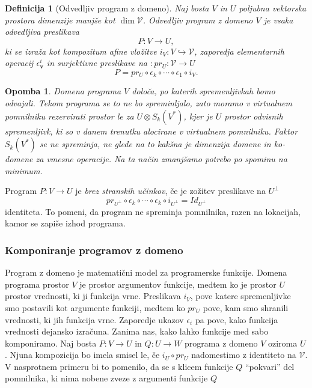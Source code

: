 \documentclass{article}
\newcommand{\VV}{\mathcal{V}}
\newcommand{\vv}{\mathbf{v}}
\newtheorem{definicija}{Definicija}[section]
\newtheorem{opomba}{Opomba}[section]
\begin{document}
\begin{definicija}[Odvedljiv program z domeno]
  Naj bosta $V$ in $U$ poljubna vektorska prostora dimenzije manjše kot $\dim \VV$.
  \emph{Odvedljiv program z domeno $V$} je vsaka odvedljiva preslikava
  \begin{equation}
    \label{eq:odvedljiv_program}
    P:V\to U,
  \end{equation}
 ki se izraža kot kompozitum  afine vložitve $i_V:V\hookrightarrow \VV$,
zaporedja elementarnih operacij $\epsilon_\vv^{i}$ in surjektivne preslikave na
$:pr_U:\VV\to U$
 \begin{equation}
   \label{eq:zapis}
   P = pr_U\circ\epsilon_{k}\circ \cdots \circ \epsilon_1\circ i_V.
 \end{equation} 
\end{definicija}
\begin{opomba}
  Domena programa $V$ določa, po katerih spremenljivkah bomo odvajali. Tekom
  programa se to ne bo spreminljalo, zato moramo v virtualnem pomnilniku
  rezervirati prostor le za $U\otimes S_k(V^*)$, kjer je $U$ prostor odvisnih
  spremenljivk, ki so v danem trenutku alocirane v virtualnem pomnilniku. Faktor 
$S_k(V^*)$ se ne spreminja, ne glede na to kakšna je dimenzija domene in
ko-domene za vmesne operacije. Na ta način zmanjšamo potrebo po spominu na minimum.
\end{opomba}

Program $P:V\to U$ je \emph{brez stranskih učinkov}, če je zožitev preslikave 
na $U^\perp$ 
$$ pr_{U^\perp}\circ \epsilon_k\circ \cdots \circ \epsilon_k\circ i_{U^\perp}=Id_{U^\perp}$$  
identiteta. To pomeni, da program ne spreminja pomnilnika, razen na lokacijah, 
kamor se zapiše izhod programa. 
 
\subsubsection{Komponiranje programov z domeno} 
 
Program z domeno je matematični model za programerske funkcije. Domena programa 
prostor $V$ je prostor argumentov funkcije, medtem ko je prostor $U$ prostor 
vrednosti, ki ji funkcija vrne. Preslikava $i_V$, pove katere spremenljivke smo 
postavili kot argumente funkciji, medtem ko $pr_U$ pove, kam smo shranili 
vrednosti, ki jih funkcija vrne. Zaporedje ukazov $\epsilon_i$ pa pove, kako 
funkcija vrednosti dejansko izračuna. 
Zanima nas, kako lahko funkcije med sabo komponiramo. Naj bosta $P:V\to U$ in 
$Q:U\to W$ programa z domeno $V$ oziroma $U$. Njuna kompozicija bo imela smisel 
le, če $i_U\circ pr_U$ nadomestimo z identiteto na $\VV$. V nasprotnem primeru bi to 
pomenilo, da se s klicem funkcije $Q$ ``pokvari'' del pomnilnika, ki nima nobene 
zveze z argumenti funkcije $Q$ 
\end{document}
